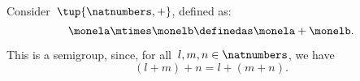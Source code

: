 \begin{example}
  \label{exa:natnum-semigroup}
  Consider~$\tup{\natnumbers,+}$, defined as:
  \begin{equation*}
    \label{eq:natnum-semigroup-definition}
    \monela \mtimes \monelb \definedas  \monela + \monelb.
\end{equation*}

  This is a semigroup, since, for all~$l,m, n \in \natnumbers$, we have
  \begin{equation*}
  (l+m)
    +n
    =l+(m+n).
  \end{equation*}
\end{example}

\begin{comment}

  \begin{equation}
    \label{eq:natnum-product}
    \monela \mtimes \monelb \definedas  \monela \cdot \monelb
\end{equation}
  \begin{equation}
    \label{eq:natnum-min}
    \monela \mtimes \monelb \definedas  \min(\monela, \monelb)
\end{equation}
  \begin{equation}
    \label{eq:natnum-max}
    \monela \mtimes \monelb \definedas  \max(\monela, \monelb)
\end{equation}
\end{comment}


